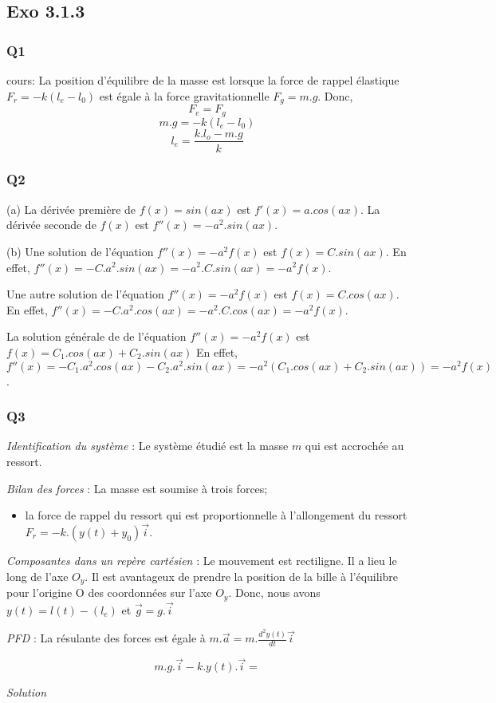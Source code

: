 \documentclass[]{book}
\theoremstyle{definition}
\begin{document}
\subsection*{Exo 3.1.3}
\subsubsection*{Q1}
cours: La position d'\'equilibre de la masse est lorsque la force de rappel \'elastique $F_r=-k(l_e-l_0)$
est \'egale \`a la force gravitationnelle $F_g = m.g$. Donc,
$$F_e = F_g$$
$$m.g = -k(l_e-l_0)$$
$$l_e = \frac{k.l_o - m.g}{k}$$


\subsubsection*{Q2}
(a) La d\'eriv\'ee premi\`ere de $f(x) = sin(ax)$ est $f'(x) = a.cos(ax)$. 
La d\'eriv\'ee seconde de $f(x)$ est $f''(x) = -a^2.sin(ax)$. 

(b) Une solution de l'\'equation $f''(x) = -a^2f(x)$ est $f(x) = C.sin(ax)$. 
En effet, $f''(x) = -C.a^2.sin(ax) = -a^2.C.sin(ax) = -a^2 f(x)$.

Une autre solution de l'\'equation $f''(x) = -a^2f(x)$ est $f(x) = C.cos(ax)$. 
En effet, $f''(x) = -C.a^2.cos(ax) = -a^2.C.cos(ax) = -a^2 f(x)$.

La solution g\'en\'erale de de l'\'equation $f''(x) = -a^2f(x)$ est $f(x) = C_1.cos(ax) + C_2.sin(ax)$
En effet, $f''(x) = -C_1.a^2.cos(ax) - C_2.a^2.sin(ax) = -a^2 (C_1.cos(ax) + C_2.sin(ax)) = -a^2 f(x)$.


\subsubsection*{Q3}
\emph{Identification du syst\`eme} : Le syst\`eme \'etudi\'e est la masse
$m$ qui est accroch\'ee au ressort.


\emph{Bilan des forces} : La masse est soumise \`a trois forces; 
\begin{itemize}
\item la force de rappel du ressort qui est proportionnelle \`a l'allongement
du ressort $F_r = -k.(y(t) + y_0)\overrightarrow{i}$.
\end{itemize}


\emph{Composantes dans un rep\`ere cart\'esien} : Le mouvement est rectiligne.
Il a lieu le long de l'axe $O_y$. Il est avantageux de prendre la
position de la bille \`a l'\'equilibre pour l'origine O des coordonn\'ees sur
l'axe $O_y$. Donc, nous avons $y(t) = l(t) - (l_e)$ et $\overrightarrow{g}=g.\overrightarrow{i}$


\emph{PFD} : La r\'esulante des forces est \'egale \`a 
$m.\overrightarrow{a}=m.\frac{d^2y(t)}{dt}\overrightarrow{i}$

$$m.g.\overrightarrow{i} -k.y(t).\overrightarrow{i} = $$


\emph{Solution}
\end{document}
